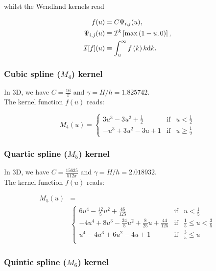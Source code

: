 \documentclass[usenatbib, useAMS,a4paper]{mnras}
\begin{document}
whilst the Wendland kernels read

\begin{align}
  f(u) &= C \Psi_{i,j}(u), \\
  \Psi_{i,j}(u) &\equiv \mathcal{I}^k\left[\max\left(1-u,0\right)\right],\\
  \mathcal{I}[f](u) &\equiv \int_u^\infty f\left(k\right)k{\rm d}k.
\end{align}

\subsubsection{Cubic spline ($M_4$) kernel}

In 3D, we have $C=\frac{16}{\pi}$ and $\gamma=H/h = 1.825742$.\\
The kernel function $f(u)$ reads:

\begin{equation}
  M_4(u) = \left\lbrace\begin{array}{rcl}
  3u^3 - 3u^2 + \frac{1}{2} & \mbox{if} & u<\frac{1}{2}\\
  -u^3 + 3u^2 - 3u + 1 & \mbox{if} & u \geq \frac{1}{2}
  \end{array}
  \right.
    \nonumber
\end{equation}


\subsubsection{Quartic spline ($M_5$) kernel}

In 3D, we have $C=\frac{15625}{512\pi}$ and $\gamma=H/h = 2.018932$.\\
The kernel function $f(u)$ reads:

\begin{align}
  M_5(u) &=     \nonumber\\
  &\left\lbrace\begin{array}{rcl}
  6u^4 - \frac{12}{5}u^2 + \frac{46}{125} & \mbox{if} & u < \frac{1}{5} \\
  -4u^4 + 8u^3  - \frac{24}{5}u^2 + \frac{8}{25}u + \frac{44}{125} &  \mbox{if} &  \frac{1}{5} \leq u < \frac{3}{5}\\
  u^4 - 4u^3 + 6u^2 - 4u + 1 &  \mbox{if} &  \frac{3}{5} \leq u \\
  \end{array}
  \right.
  \nonumber
\end{align}


\subsubsection{Quintic spline ($M_6$) kernel}
\end{document}
